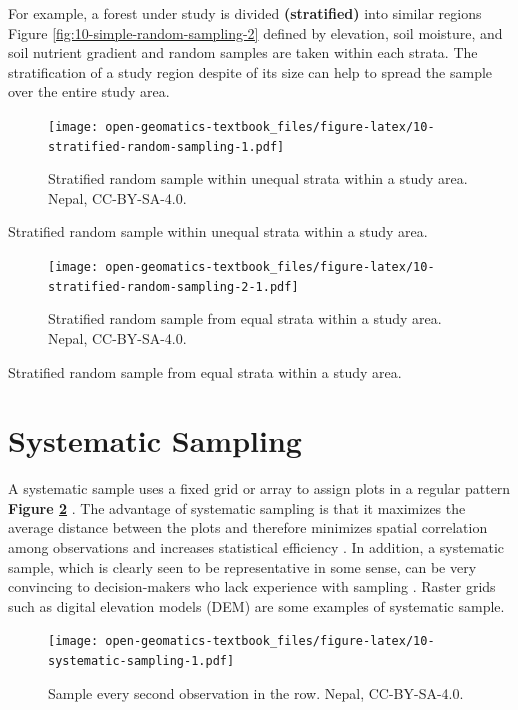 \documentclass[
]{book}
\begin{document}
For example, a forest under study is divided \textbf{(stratified)} into similar regions Figure \ref{fig:10-simple-random-sampling-2} defined by elevation, soil moisture, and soil nutrient gradient and random samples are taken within each strata. The stratification of a study region despite of its size can help to spread the sample over the entire study area.

\begin{figure}
\centering
\texttt{[image: open-geomatics-textbook\_files/figure-latex/10-stratified-random-sampling-1.pdf]}
\caption{\label{fig:10-stratified-random-sampling}Stratified random sample within unequal strata within a study area. Nepal, CC-BY-SA-4.0.}
\end{figure}

Stratified random sample within unequal strata within a study area.

\begin{figure}
\centering
\texttt{[image: open-geomatics-textbook\_files/figure-latex/10-stratified-random-sampling-2-1.pdf]}
\caption{\label{fig:10-stratified-random-sampling-2}Stratified random sample from equal strata within a study area. Nepal, CC-BY-SA-4.0.}
\end{figure}

Stratified random sample from equal strata within a study area.

\hypertarget{systematic-sampling}{%
\section{Systematic Sampling}\label{systematic-sampling}}

A systematic sample uses a fixed grid or array to assign plots in a regular pattern \textbf{Figure \ref{fig:10-stratified-random-sampling-2}} \citep{mcroberts_sampling_2014}. The advantage of systematic sampling is that it maximizes the average distance between the plots and therefore minimizes spatial correlation among observations and increases statistical efficiency \citep{mcroberts_sampling_2014}. In addition, a systematic sample, which is clearly seen to be representative in some sense, can be very convincing to decision-makers who lack experience with sampling \citep{mcroberts_sampling_2014}. Raster grids such as digital elevation models (DEM) are some examples of systematic sample.

\begin{figure}
\centering
\texttt{[image: open-geomatics-textbook\_files/figure-latex/10-systematic-sampling-1.pdf]}
\caption{\label{fig:10-systematic-sampling}Sample every second observation in the row. Nepal, CC-BY-SA-4.0.}
\end{figure}
\end{document}
